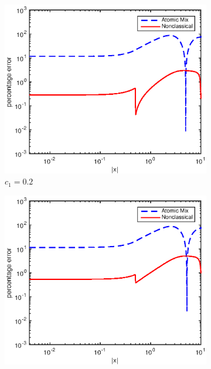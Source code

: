 \documentclass[12pt]{article}
\begin{document}
{\begin{figure}[p]
\begin{subfigure}{0.495\textwidth}
        \label{figerrE10}
    \end{subfigure}
    \\
    \centering
    \begin{subfigure}{0.495\textwidth}
        \centering
        \includegraphics[width=\textwidth]{NSE_err_E20.eps}
        \caption{$c_1 = 0.2$}
        \label{figerrE20}
    \end{subfigure}
    \hfill
    \begin{subfigure}{0.495\textwidth}
        \centering
        \includegraphics[width=\textwidth]{NSE_err_E30.eps}

\end{subfigure}
\end{figure}}
\end{document}

